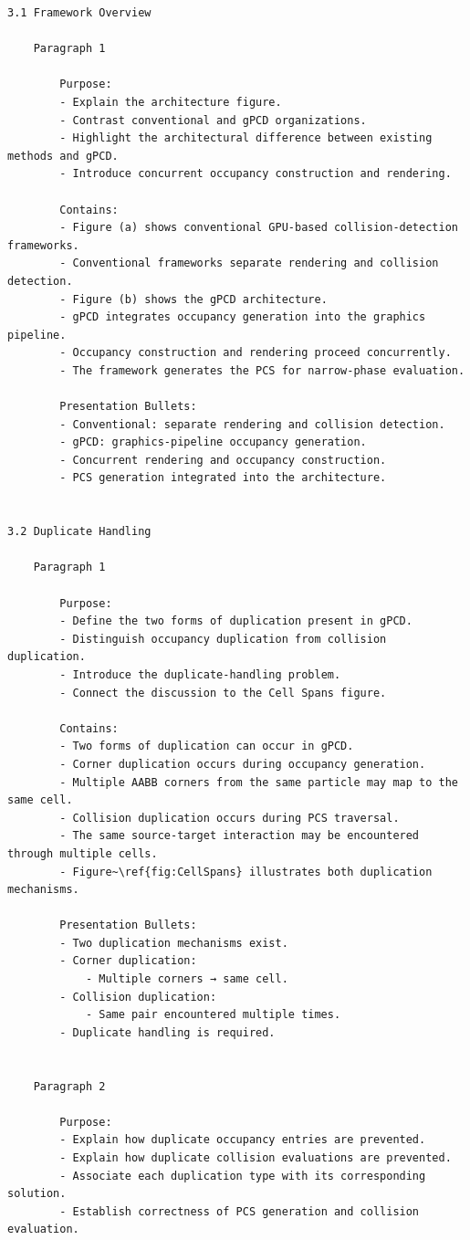 \begin{verbatim}
3.1 Framework Overview

	Paragraph 1

		Purpose:
		- Explain the architecture figure.
		- Contrast conventional and gPCD organizations.
		- Highlight the architectural difference between existing methods and gPCD.
		- Introduce concurrent occupancy construction and rendering.

		Contains:
		- Figure (a) shows conventional GPU-based collision-detection frameworks.
		- Conventional frameworks separate rendering and collision detection.
		- Figure (b) shows the gPCD architecture.
		- gPCD integrates occupancy generation into the graphics pipeline.
		- Occupancy construction and rendering proceed concurrently.
		- The framework generates the PCS for narrow-phase evaluation.

		Presentation Bullets:
		- Conventional: separate rendering and collision detection.
		- gPCD: graphics-pipeline occupancy generation.
		- Concurrent rendering and occupancy construction.
		- PCS generation integrated into the architecture.  
   
   
3.2 Duplicate Handling

	Paragraph 1

		Purpose:
		- Define the two forms of duplication present in gPCD.
		- Distinguish occupancy duplication from collision duplication.
		- Introduce the duplicate-handling problem.
		- Connect the discussion to the Cell Spans figure.

		Contains:
		- Two forms of duplication can occur in gPCD.
		- Corner duplication occurs during occupancy generation.
		- Multiple AABB corners from the same particle may map to the same cell.
		- Collision duplication occurs during PCS traversal.
		- The same source-target interaction may be encountered through multiple cells.
		- Figure~\ref{fig:CellSpans} illustrates both duplication mechanisms.

		Presentation Bullets:
		- Two duplication mechanisms exist.
		- Corner duplication:
			- Multiple corners → same cell.
		- Collision duplication:
			- Same pair encountered multiple times.
		- Duplicate handling is required.  


	Paragraph 2

		Purpose:
		- Explain how duplicate occupancy entries are prevented.
		- Explain how duplicate collision evaluations are prevented.
		- Associate each duplication type with its corresponding solution.
		- Establish correctness of PCS generation and collision evaluation.


\end{verbatim}
